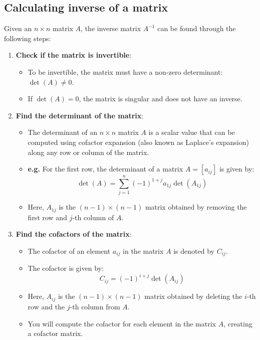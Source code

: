 \subsection{Calculating inverse of a matrix}
\begin{process}
    Given an \( n \times n \) matrix \( A \), the inverse matrix \( A^{-1} \) can be found through the following steps:

    \begin{enumerate}
        \item \textbf{Check if the matrix is invertible}:
        \begin{itemize}
            \item To be invertible, the matrix must have a non-zero determinant: \( \det(A) \neq 0 \).
            \item If \( \det(A) = 0 \), the matrix is singular and does not have an inverse.
        \end{itemize}

        \item \textbf{Find the determinant of the matrix}:
        \begin{itemize}
            \item The determinant of an \( n \times n \) matrix \( A \) is a scalar value that can be computed using cofactor expansion (also known as Laplace's expansion) along any row or column of the matrix.
            \item \textbf{e.g.} For the first row, the determinant of a matrix \( A = [a_{ij}] \) is given by:
            \[
            \det(A) = \sum_{j=1}^{n} (-1)^{1+j} a_{1j} \det(A_{1j})
            \]
            \item Here, \( A_{1j} \) is the \((n-1) \times (n-1)\) matrix obtained by removing the first row and \( j \)-th column of \( A \).
        \end{itemize}
        
        \item \textbf{Find the cofactors of the matrix}:
        \begin{itemize}
            \item The cofactor of an element \( a_{ij} \) in the matrix \( A \) is denoted by \( C_{ij} \).
            \item The cofactor is given by:
            \[
            C_{ij} = (-1)^{i+j} \det(A_{ij})
            \]
            \item Here, \( A_{ij} \) is the \((n-1) \times (n-1)\) matrix obtained by deleting the \( i \)-th row and the \( j \)-th column from \( A \).
            \item You will compute the cofactor for each element in the matrix \( A \), creating a cofactor matrix.
        \end{itemize}
        

\end{enumerate}
\end{process}
